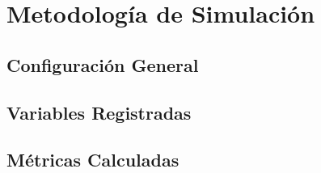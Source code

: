 
\section{Metodología de Simulación}
\subsection{Configuración General}
\subsection{Variables Registradas}
\subsection{Métricas Calculadas}